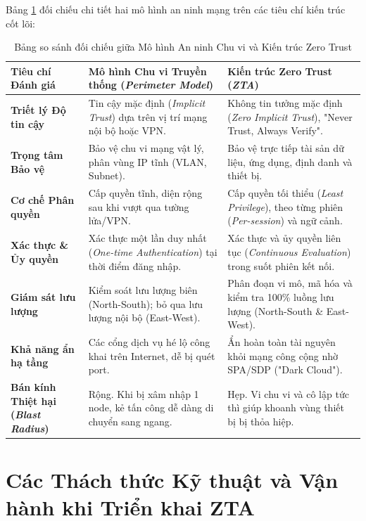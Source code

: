 Bảng \ref{tab:comparison_perimeter_vs_zta} đối chiếu chi tiết hai mô hình an ninh mạng trên các tiêu chí kiến trúc cốt lõi:

\begin{table}[htbp]
\centering
\caption{Bảng so sánh đối chiếu giữa Mô hình An ninh Chu vi và Kiến trúc Zero Trust}
\label{tab:comparison_perimeter_vs_zta}
\small
\begin{tabular}{|p{3cm}|p{5.5cm}|p{5.5cm}|}
\hline
\textbf{Tiêu chí Đánh giá} & \textbf{Mô hình Chu vi Truyền thống (\textit{Perimeter Model})} & \textbf{Kiến trúc Zero Trust (\textit{ZTA})} \\ \hline
\textbf{Triết lý Độ tin cậy} & Tin cậy mặc định (\textit{Implicit Trust}) dựa trên vị trí mạng nội bộ hoặc VPN. & Không tin tưởng mặc định (\textit{Zero Implicit Trust}), "Never Trust, Always Verify". \\ \hline
\textbf{Trọng tâm Bảo vệ} & Bảo vệ chu vi mạng vật lý, phân vùng IP tĩnh (VLAN, Subnet). & Bảo vệ trực tiếp tài sản dữ liệu, ứng dụng, định danh và thiết bị. \\ \hline
\textbf{Cơ chế Phân quyền} & Cấp quyền tĩnh, diện rộng sau khi vượt qua tường lửa/VPN. & Cấp quyền tối thiểu (\textit{Least Privilege}), theo từng phiên (\textit{Per-session}) và ngữ cảnh. \\ \hline
\textbf{Xác thực \& Ủy quyền} & Xác thực một lần duy nhất (\textit{One-time Authentication}) tại thời điểm đăng nhập. & Xác thực và ủy quyền liên tục (\textit{Continuous Evaluation}) trong suốt phiên kết nối. \\ \hline
\textbf{Giám sát lưu lượng} & Kiểm soát lưu lượng biên (North-South); bỏ qua lưu lượng nội bộ (East-West). & Phân đoạn vi mô, mã hóa và kiểm tra 100\% luồng lưu lượng (North-South \& East-West). \\ \hline
\textbf{Khả năng ẩn hạ tầng} & Các cổng dịch vụ hé lộ công khai trên Internet, dễ bị quét port. & Ẩn hoàn toàn tài nguyên khỏi mạng công cộng nhờ SPA/SDP ("Dark Cloud"). \\ \hline
\textbf{Bán kính Thiệt hại (\textit{Blast Radius})} & Rộng. Khi bị xâm nhập 1 node, kẻ tấn công dễ dàng di chuyển sang ngang. & Hẹp. Vi chu vi và cô lập tức thì giúp khoanh vùng thiết bị bị thỏa hiệp. \\ \hline
\end{tabular}
\end{table}

\section{Các Thách thức Kỹ thuật và Vận hành khi Triển khai ZTA}
\label{sec:2_5}

